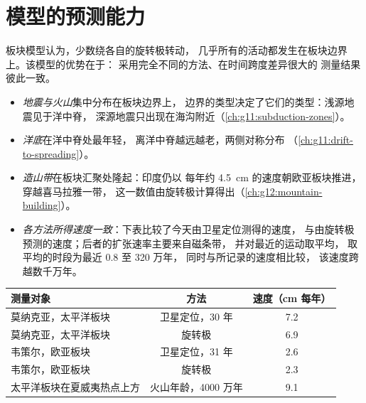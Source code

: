 \section{模型的预测能力}\label{sec:g11:plate-motions:predictive}

板块模型认为，少数绕各自的旋转极转动，
几乎所有的活动都发生在板块边界上。该模型的优势在于：
采用完全不同的方法、在时间跨度差异很大的
测量结果彼此一致。

\begin{itemize}
  \item \emph{地震与火山}集中分布在板块边界上，
        边界的类型决定了它们的类型：浅源地震见于洋中脊，
        深源地震只出现在海沟附近（\cref{ch:g11:subduction-zones}）。
  \item \emph{洋底}在洋中脊处最年轻，
        离洋中脊越远越老，两侧对称分布
        （\cref{ch:g11:drift-to-spreading}）。
  \item \emph{造山带}在板块汇聚处隆起：印度仍以
        每年约 \qty{4.5}{cm} 的速度朝欧亚板块推进，穿越喜马拉雅一带，
        这一数值由旋转极计算得出（\cref{ch:g12:mountain-building}）。
  \item \emph{各方法所得速度一致}：下表比较了今天由卫星定位测得的速度，
        与由旋转极预测的速度；后者的扩张速率主要来自磁条带，
        并对最近的运动取平均，
        取平均的时段为最近 \num{0.8} 至 320 万年，
        同时与所记录的速度相比较，
        该速度跨越数千万年。
\end{itemize}

\begin{center}
\small
\begin{tabular}{|l|c|c|}
\hline
测量对象 & 方法 & 速度（\unit{cm} 每年） \\ \hline
莫纳克亚，太平洋板块 & 卫星定位，30 年 & 7.2 \\
莫纳克亚，太平洋板块 & 旋转极 & 6.9 \\
韦策尔，欧亚板块 & 卫星定位，31 年 & 2.6 \\
韦策尔，欧亚板块 & 旋转极 & 2.3 \\
太平洋板块在夏威夷热点上方 & 火山年龄，4000 万年 & 9.1 \\ \hline
\end{tabular}
\end{center}

